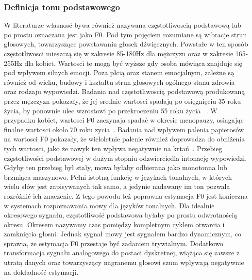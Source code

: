 \documentclass[a4paper,12 pt]{article}
\begin{document}
\subsubsection{Definicja tonu podstawowego}
W literaturze własnosć bywa również nazywana częstotliwoscią podstawową lub po prostu oznaczana jest jako F0. Pod tym pojęciem rozumiane są wibracje strun głosowych, towarzyszące powstawaniu głosek dźwięcznych. Powstałe w ten sposób częstotliwosci mieszczą się w zakresie 85-180Hz dla mężczyzn oraz w zakresie 165-255Hz dla kobiet. Wartosci te mogą być wyższe gdy osoba mówiąca znajduje się pod wpływem silnych emocji. Poza płcią oraz stanem emocjalnym, zależne są również od wieku, budowy i kształtu strun głosowych ogólnego stanu zdrowia oraz rodzaju wypowiedzi. Badania nad częstotliwoscią podstawową produkowaną przez męzczyzn pokazały, że jej srednie wartosci spadają po osięgnięciu 35 roku życia, by ponownie ulec wzrostowi po przekroczeniu 55 roku życia ~\cite{Hollien_Ship}. W przypadku kobiet, wartosci F0 zaczynaja spadać w okresie menopauzy, osiagając finalne wartosci okolo 70 roku zycia~\cite{Pegoraro-Krook}. Badania nad wpływem palenia papierosów na wartosci F0 pokazały, że wieloletnie palenie również doprowadza do obniżenia tych wartosci, jako że nawyk ten wpływa negatywnie na krtań~\cite{Gilbert}.
Przebieg częstotliwości podstawowej w dużym stopniu odzwierciedla intonację wypowiedzi. Gdyby ten przebieg był stały, mowa byłaby odbierana jako monotonna lub brzmiąca maszynowo.  Pełni istotną funkcję w językach tonalnych, w których wielu słów jest zapisywanych tak samo, a jedynie nadawany im ton pozwala rozróżnić ich znaczenie. Z tego powodu też poprawna estymacja F0 jest konieczna w systemach rozpoznawania mowy dla języków tonalnych.
Dla idealnie okresowego sygnału, częstotliwość podstawowa byłaby po prostu odwrotnością okresu. Okresem nazywamy czas pomiędzy kompletnym cyklem otwarcia i zamknięcia głosni. Jednak sygnał mowy jest sygnałem bardzo dynamicznym, co sprawia, że estymacja F0 przestaje być zadaniem trywialnym. Dodatkowo transformacja sygnału analogowego do postaci dyskretnej, wiążąca się zawsze z utratą danych oraz towarzyszący nagranemu głosowi szum wpływają negatywnie na dokładność estymacji. 
\end{document}
